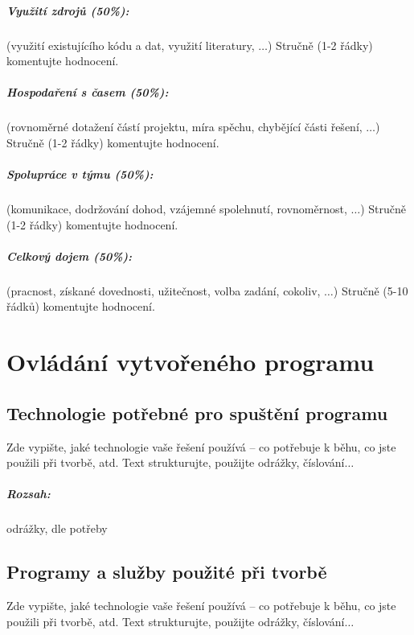 \documentclass[12pt,a4paper,titlepage,final]{report}
\begin{document}
\paragraph{Využití zdrojů (50\%):} (využití existujícího kódu a dat, využití
literatury, $\ldots$)
Stručně (1-2 řádky) komentujte hodnocení.

\paragraph{Hospodaření s časem (50\%):} (rovnoměrné dotažení částí projektu,
míra spěchu, chybějící části řešení, $\ldots$)
Stručně (1-2 řádky) komentujte hodnocení.

\paragraph{Spolupráce v týmu (50\%):} (komunikace, dodržování dohod, vzájemné
spolehnutí, rovnoměrnost, $\ldots$)
Stručně (1-2 řádky) komentujte hodnocení.

\paragraph{Celkový dojem (50\%):} (pracnost, získané dovednosti, užitečnost,
volba zadání, cokoliv, $\ldots$)
Stručně (5-10 řádků) komentujte hodnocení.

\chapter{Ovládání vytvořeného programu}

\section{Technologie potřebné pro spuštění programu}
Zde vypište, jaké technologie vaše řešení používá – co potřebuje k běhu, co
jste použili při tvorbě, atd. Text strukturujte, použijte odrážky,
číslování$\ldots$

\paragraph{Rozsah:} odrážky, dle potřeby

\section{Programy a služby použité při tvorbě}
Zde vypište, jaké technologie vaše řešení používá – co potřebuje k běhu, co
jste použili při tvorbě, atd. Text strukturujte, použijte odrážky,
číslování$\ldots$
\end{document}
